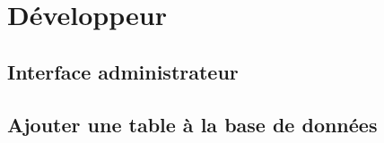 \part{Développeur}





\chapter{Interface administrateur}



\chapter{Ajouter une table à la base de données}


